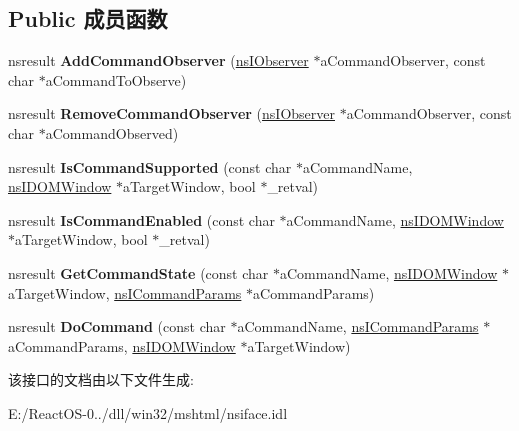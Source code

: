 \subsection*{Public 成员函数}
\begin{DoxyCompactItemize}
\item 
\mbox{\label{interfacens_i_command_manager_a33ac8b23729c93172b44f3e6f60af82e}} 
nsresult {\bfseries Add\+Command\+Observer} (\hyperlink{interfacens_i_supports}{ns\+I\+Observer} $\ast$a\+Command\+Observer, const char $\ast$a\+Command\+To\+Observe)
\item 
\mbox{\label{interfacens_i_command_manager_ae8c01507fee8664ec4052c629ded944d}} 
nsresult {\bfseries Remove\+Command\+Observer} (\hyperlink{interfacens_i_supports}{ns\+I\+Observer} $\ast$a\+Command\+Observer, const char $\ast$a\+Command\+Observed)
\item 
\mbox{\label{interfacens_i_command_manager_aba121edbe8ab022e88508bbdc5e4246f}} 
nsresult {\bfseries Is\+Command\+Supported} (const char $\ast$a\+Command\+Name, \hyperlink{interfacens_i_d_o_m_window}{ns\+I\+D\+O\+M\+Window} $\ast$a\+Target\+Window, bool $\ast$\+\_\+retval)
\item 
\mbox{\label{interfacens_i_command_manager_ae9ec79d901cde98c5192a3276e0da647}} 
nsresult {\bfseries Is\+Command\+Enabled} (const char $\ast$a\+Command\+Name, \hyperlink{interfacens_i_d_o_m_window}{ns\+I\+D\+O\+M\+Window} $\ast$a\+Target\+Window, bool $\ast$\+\_\+retval)
\item 
\mbox{\label{interfacens_i_command_manager_ac84968222ab9e88ba34b7e3ba2e5d5ef}} 
nsresult {\bfseries Get\+Command\+State} (const char $\ast$a\+Command\+Name, \hyperlink{interfacens_i_d_o_m_window}{ns\+I\+D\+O\+M\+Window} $\ast$a\+Target\+Window, \hyperlink{interfacens_i_command_params}{ns\+I\+Command\+Params} $\ast$a\+Command\+Params)
\item 
\mbox{\label{interfacens_i_command_manager_ae8564c6746b7507be73f672089278cff}} 
nsresult {\bfseries Do\+Command} (const char $\ast$a\+Command\+Name, \hyperlink{interfacens_i_command_params}{ns\+I\+Command\+Params} $\ast$a\+Command\+Params, \hyperlink{interfacens_i_d_o_m_window}{ns\+I\+D\+O\+M\+Window} $\ast$a\+Target\+Window)
\end{DoxyCompactItemize}


该接口的文档由以下文件生成\+:\begin{DoxyCompactItemize}
\item 
E\+:/\+React\+O\+S-\/0../dll/win32/mshtml/nsiface.\+idl\end{DoxyCompactItemize}
